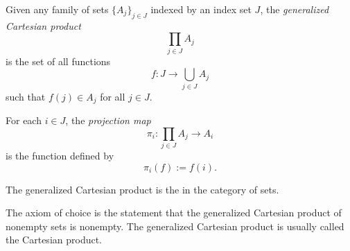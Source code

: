 \documentclass[12pt]{article}
\begin{document}
Given any family of sets $\{A_j\}_{j \in J}$ indexed by an index set $J$, the \emph{generalized Cartesian product}
\[
\prod_{j \in J} A_j
\]
is the set of all functions
\[
f\colon J \to \bigcup_{j \in J} A_j
\]
such that $f(j) \in A_j$ for all $j \in J$.

For each $i \in J$, the \emph{projection map} 
\[
\pi_i\colon \prod_{j \in J} A_j \to A_i
\]
is the function defined by
\[
\pi_i(f) := f(i).
\]

The generalized Cartesian product is the  in the category of sets.

The axiom of choice is the statement that the generalized Cartesian product of nonempty sets is nonempty.
The generalized Cartesian product is usually called the Cartesian product.
\end{document}
